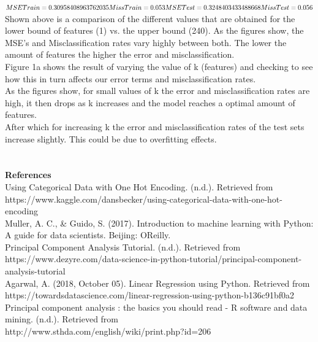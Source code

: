 \documentclass[a4paper]{article}
\begin{document}
$MSE Train = 0.30958408963762035 \\ Miss Train = 0.053 \\ MSE Test = 0.3248403433488668 \\ Miss Test = 0.056$
\\

Shown above is a comparison of the different values that are obtained for the lower bound of features (1) vs. the upper bound (240). As the figures show, the MSE's and Misclassification rates vary highly between both. The lower the amount of features the higher the error and misclassification. \\



Figure 1a shows the result of varying the value of k (features) and checking to see how this in turn affects our error terms and misclassification rates. \\


As the figures show, for small values of k the error and misclassification rates are high, it then drops as k increases and the model reaches a optimal amount of features. \\ After which for increasing k the error and misclassification rates of the test sets increase slightly. This could be due to overfitting effects. \\ \\
\\

\textbf{{\Large References}} \\

Using Categorical Data with One Hot Encoding. (n.d.). Retrieved from \\ https://www.kaggle.com/dansbecker/using-categorical-data-with-one-hot-encoding \\

Muller, A. C., \& Guido, S. (2017). Introduction to machine learning with Python: A guide for data scientists. Beijing: OReilly. \\

Principal Component Analysis Tutorial. (n.d.). Retrieved from \\ https://www.dezyre.com/data-science-in-python-tutorial/principal-component-analysis-tutorial \\

Agarwal, A. (2018, October 05). Linear Regression using Python. Retrieved from \\ https://towardsdatascience.com/linear-regression-using-python-b136c91bf0a2 \\

Principal component analysis : the basics you should read - R software and data mining. (n.d.). Retrieved from \\ http://www.sthda.com/english/wiki/print.php?id=206 \\
\end{document}
